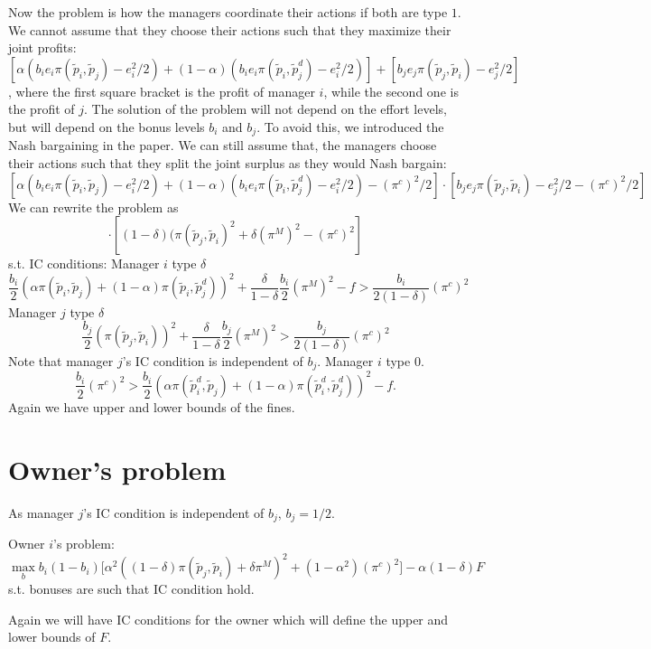 \documentclass{article}
\begin{document}
Now the problem is how the managers coordinate their actions if both are type $1$. We cannot assume that they choose their actions such that they maximize their joint profits: $$[\alpha(b_i e_i \pi(\tilde{p}_i, \tilde{p}_j)-e_i^2/2)+(1-\alpha)(b_i e_i \pi(\tilde{p}_i, \tilde{p}_j^d)-e_i^2/2)]+[b_j e_j \pi(\tilde{p}_j, \tilde{p}_i)-e_j^2/2]$$, where the first square bracket is the profit of manager $i$, while the second one is the profit of $j$. The solution of the problem will not depend on the effort levels, but will depend on the bonus levels $b_i$ and $b_j$. To avoid this, we introduced the Nash bargaining in the paper. We can still assume that, the managers choose their actions such that they split the joint surplus as they would Nash bargain:
$$[\alpha(b_i e_i \pi(\tilde{p}_i, \tilde{p}_j)-e_i^2/2)+(1-\alpha)(b_i e_i \pi(\tilde{p}_i, \tilde{p}_j^d)-e_i^2/2)-(\pi^c)^2/2]\cdot[b_j e_j \pi(\tilde{p}_j, \tilde{p}_i)-e_j^2/2-(\pi^c)^2/2]$$
We can rewrite the problem as
\begin{equation}
    [(1-\delta)(\alpha\pi(\tilde{p}_i, \tilde{p}_j)+(1-\alpha)\pi(\tilde{p}_i, \tilde{p}_j^d))^2+\delta(\pi^M)^2-(\pi^c)^2]\cdot[(1-\delta)(\pi(\tilde{p}_j, \tilde{p}_i)^2+\delta(\pi^M)^2-(\pi^c)^2]
\end{equation}
s.t. IC conditions:
Manager $i$ type $\delta$
\begin{equation}
    \frac{b_i}{2}(\alpha\pi(\tilde{p}_i, \tilde{p}_j)+(1-\alpha)\pi(\tilde{p}_i, \tilde{p}_j^d))^2 + \frac{\delta}{1-\delta} \frac{b_i}{2} (\pi^M)^2 - f> \frac{b_i}{2(1-\delta)} (\pi^c)^2
\end{equation}
Manager $j$ type $\delta$
\begin{equation}
    \frac{b_j}{2}(\pi(\tilde{p}_j, \tilde{p}_i))^2 + \frac{\delta}{1-\delta} \frac{b_j}{2} (\pi^M)^2 > \frac{b_j}{2(1-\delta)} (\pi^c)^2
\end{equation}
Note that manager $j$'s IC condition is independent of $b_j$.
Manager $i$ type $0$.
\begin{equation}
   \frac{b_i}{2} (\pi^c)^2 > \frac{b_i}{2}(\alpha\pi(\tilde{p}^d_i, \tilde{p}_j)+(1-\alpha)\pi(\tilde{p}^d_i, \tilde{p}_j^d))^2 - f. 
\end{equation}
Again we have upper and lower bounds of the fines.

\section{Owner's problem}
As manager $j$'s IC condition is independent of $b_j$, $b_j = 1/2$.

Owner $i$'s problem:
\begin{equation}\label{prog:owners}
\max_{b} b_i (1-b_i) \big[\alpha^2 ((1-\delta)\pi(\tilde{p}_j, \tilde{p}_i) + \delta \pi^M)^2 + (1-\alpha^2) (\pi^c)^2\big]- \alpha (1-\delta)F
\end{equation}
s.t. bonuses are such that IC condition hold.

Again we will have IC conditions for the owner which will define the upper and lower bounds of $F$.
\end{document}
